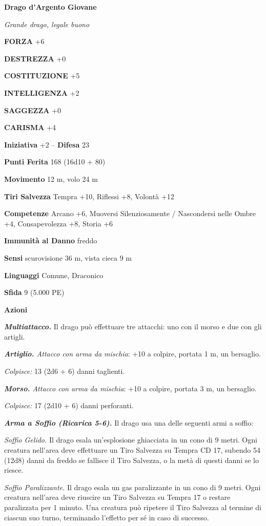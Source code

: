 \begin{multicols}{2}
\medskip{}\textbf{Drago d'Argento Giovane}

\emph{Grande drago, legale buono}

\textbf{FORZA} +6

\textbf{DESTREZZA} +0

\textbf{COSTITUZIONE} +5

\textbf{INTELLIGENZA} +2

\textbf{SAGGEZZA} +0

\textbf{CARISMA} +4

\textbf{Iniziativa} +2 -- \textbf{Difesa} 23

\textbf{Punti Ferita} 168 (16d10 + 80)

\textbf{Movimento} 12 m, volo 24 m

\textbf{Tiri Salvezza} Tempra +10, Riflessi +8, Volontà +12

\textbf{Competenze} Arcano +6, Muoversi Silenziosamente / Nascondersi nelle Ombre +4, Consapevolezza +8, Storia +6

\textbf{Immunità al Danno} freddo

\textbf{Sensi} scurovisione 36 m, vista cieca 9 m

\textbf{Linguaggi} Comune, Draconico

\textbf{Sfida} 9 (5.000 PE)

\textbf{Azioni}

\emph{\textbf{Multiattacco.}} Il drago può effettuare tre attacchi: uno con il morso e due con gli artigli.

\emph{\textbf{Artiglio.} Attacco con arma da mischia}: +10 a colpire, portata 1 m, un bersaglio.

\emph{Colpisce:} 13 (2d6 + 6) danni taglienti.

\emph{\textbf{Morso.} Attacco con arma da mischia}: +10 a colpire, portata 3 m, un bersaglio.

\emph{Colpisce:} 17 (2d10 + 6) danni perforanti.

\emph{\textbf{Arma a Soffio (Ricarica 5-6).}} Il drago usa una delle seguenti armi a soffio:

\emph{Soffio Gelido.} Il drago esala un'esplosione ghiacciata in un cono di 9 metri. Ogni creatura nell'area deve effettuare un Tiro Salvezza su Tempra CD 17, subendo 54 (12d8) danni da freddo se fallisce il Tiro Salvezza, o la metà di questi danni se lo riesce.

\emph{Soffio Paralizzante.} Il drago esala un gas paralizzante in un cono di 9 metri. Ogni creatura nell'area deve riuscire un Tiro Salvezza su Tempra 17 o restare paralizzata per 1 minuto. Una creatura può ripetere il Tiro Salvezza al termine di ciascun suo turno, terminando l'effetto per sé in caso di successo.


\end{multicols}
